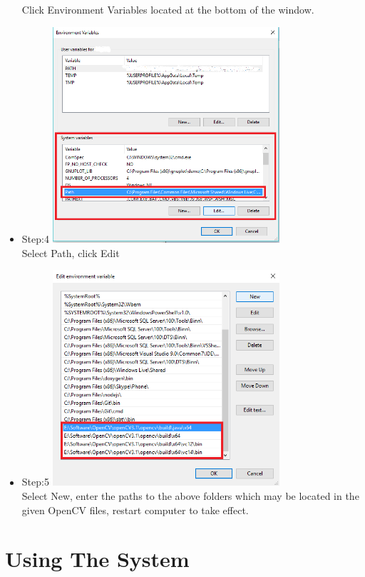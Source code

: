 \documentclass[a4paper,12pt]{report}
\begin{document}
\begin{itemize}
		\linebreak
		Click Environment Variables located at the bottom of the window.
		\item Step:4	\linebreak
		\includegraphics[height=8cm]{../Images/004.png}\\
		\linebreak
		Select Path, click Edit
		\pagebreak
		\item Step:5	\linebreak
		\includegraphics[height=8cm]{../Images/005.png}\\
		\linebreak
		Select New, enter the paths to the above folders which may be located in the given
		OpenCV files, restart computer to take effect.
	\end{itemize}
	
	\section{Using The System}
\end{document}
